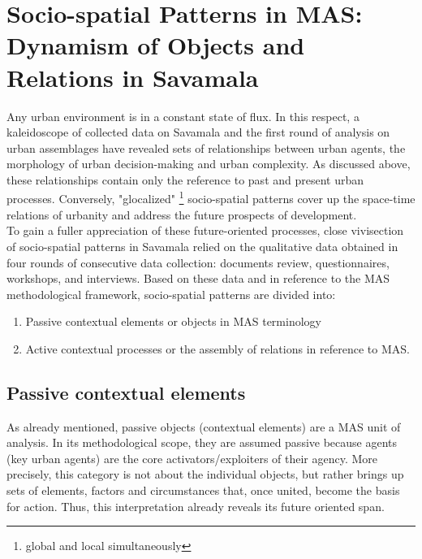\documentclass[11pt]{report}
\begin{document}
{{{{\section{Socio-spatial Patterns in MAS: Dynamism of Objects and Relations in Savamala}

Any urban environment is in a constant state of flux.
In this respect, a kaleidoscope of collected data on Savamala and the first round of analysis on urban assemblages have revealed sets of relationships between urban agents, the morphology of urban decision-making and urban complexity.
As discussed above, these relationships contain only the reference to past and present urban processes.
Conversely, "glocalized"
\footnote{global and local simultaneously}
socio-spatial patterns cover up the space-time relations of urbanity and address the future prospects of development.
\\

To gain a fuller appreciation of these future-oriented processes, close vivisection of socio-spatial patterns in Savamala relied on the qualitative data obtained in four rounds of consecutive data collection:
documents review, questionnaires, workshops, and interviews.
Based on these data and in reference to the MAS methodological framework, socio-spatial patterns are divided into:

\begin{enumerate}
\item Passive contextual elements or objects in MAS terminology
\item Active contextual processes or the assembly of relations in reference to MAS.
\end{enumerate}

\subsection{Passive contextual elements}

As already mentioned, passive objects (contextual elements) are a MAS unit of analysis. In its methodological scope, they are assumed passive because agents (key urban agents) are the core activators/exploiters of their agency. More precisely, this category is not about the individual objects, but rather brings up sets of elements, factors and circumstances that, once united, become the basis for action. Thus, this interpretation already reveals its future oriented span. 
\\

}}}}
\end{document}
